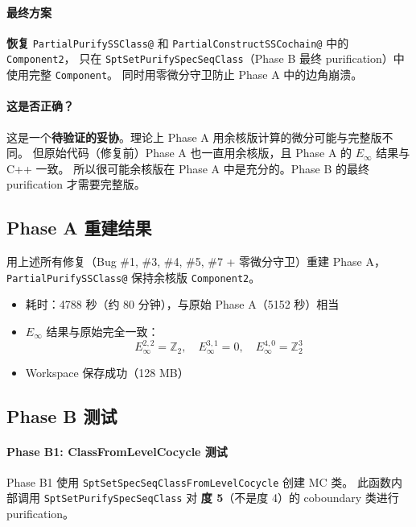 \documentclass[a4paper,fontset=ubuntu,12pt]{ctexart}
\begin{document}
\paragraph{最终方案}
\textbf{恢复} \texttt{PartialPurifySSClass@} 和 \texttt{PartialConstructSSCochain@} 中的 \texttt{Component2}，
只在 \texttt{SptSetPurifySpecSeqClass}（Phase B 最终 purification）中使用完整 \texttt{Component}。
同时用零微分守卫防止 Phase A 中的边角崩溃。

\paragraph{这是否正确？}
这是一个\textbf{待验证的妥协}。理论上 Phase A 用余核版计算的微分可能与完整版不同。
但原始代码（修复前）Phase A 也一直用余核版，且 Phase A 的 $E_\infty$ 结果与 C++ 一致。
所以很可能余核版在 Phase A 中是充分的。Phase B 的最终 purification 才需要完整版。

\subsection{Phase A 重建结果}
\label{sec:phaseA-rebuild}

用上述所有修复（Bug \#1, \#3, \#4, \#5, \#7 + 零微分守卫）重建 Phase A，
\texttt{PartialPurifySSClass@} 保持余核版 \texttt{Component2}。

\begin{itemize}
\item 耗时：4788 秒（约 80 分钟），与原始 Phase A（5152 秒）相当
\item $E_\infty$ 结果与原始完全一致：
\begin{equation}
E_\infty^{2,2} = \mathbb{Z}_2, \quad
E_\infty^{3,1} = 0, \quad
E_\infty^{4,0} = \mathbb{Z}_2^3
\end{equation}
\item Workspace 保存成功（128 MB）
\end{itemize}

\subsection{Phase B 测试}
\label{sec:phaseB-result}

\paragraph{Phase B1: ClassFromLevelCocycle 测试}

Phase B1 使用 \texttt{SptSetSpecSeqClassFromLevelCocycle} 创建 MC 类。
此函数内部调用 \texttt{SptSetPurifySpecSeqClass} 对 \textbf{度 5}（不是度 4）的 coboundary 类进行 purification。
\end{document}
